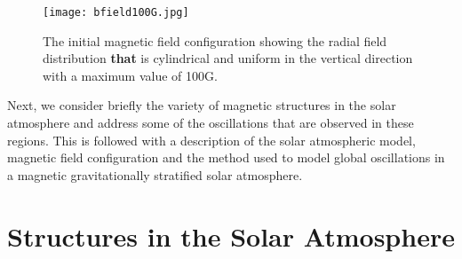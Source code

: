 \documentclass[physics,article,submit,pdftex,moreauthors]{Definitions/mdpi}
\begin{document}
\begin{figure}[h]\label{inimagfieldplot}
\centering
\texttt{[image: bfield100G.jpg]}
\caption{The initial magnetic field configuration showing the radial field distribution {\bf that} is cylindrical and uniform in the vertical direction with a maximum value of 100G.}
\end{figure}

\break




Next, we consider briefly the variety of magnetic structures in the solar atmosphere and address some of the oscillations that are observed in these regions. This is followed with a description of the solar atmospheric model, magnetic field configuration and the method used to  model global oscillations in a magnetic gravitationally stratified solar atmosphere.
\section{Structures in the Solar Atmosphere}

\label{sec:structures}
\end{document}
